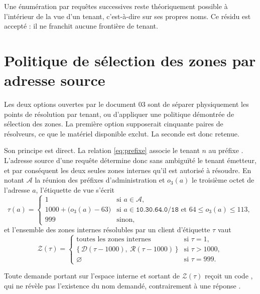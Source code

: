 Une énumération par requêtes successives reste théoriquement possible à
l'intérieur de la vue d'un tenant, c'est-à-dire sur ses propres noms. Ce résidu
est accepté : il ne franchit aucune frontière de tenant.

\section{Politique de sélection des zones par adresse source}
\label{sec:vue}

Les deux options ouvertes par le document 03 sont de séparer physiquement les
points de résolution par tenant, ou d'appliquer une politique démontrée de
sélection des zones. La première option supposerait cinquante paires de
résolveurs, ce que le matériel disponible exclut. La seconde est donc retenue.

Son principe est direct. La relation \eqref{eq:prefixe} associe le tenant $n$ au
préfixe . L'adresse source d'une requête détermine donc
sans ambiguïté le tenant émetteur, et par conséquent les deux seules zones
internes qu'il est autorisé à résoudre. En notant $\mathcal{A}$ la réunion des
préfixes d'administration et $o_3(a)$ le troisième octet de l'adresse $a$,
l'étiquette de vue s'écrit
\begin{equation}
  \tau(a) =
  \begin{cases}
    1 & \text{si } a \in \mathcal{A},\\[3pt]
    1000 + \bigl(o_3(a) - 63\bigr)
      & \text{si } a \in \texttt{10.30.64.0/18}
        \text{ et } 64 \leqslant o_3(a) \leqslant 113,\\[3pt]
    999 & \text{sinon,}
  \end{cases}
  \label{eq:tau}
\end{equation}
et l'ensemble des zones internes résolubles par un client d'étiquette
$\tau$ vaut
\begin{equation}
  \mathcal{Z}(\tau) =
  \begin{cases}
    \text{toutes les zones internes} & \text{si } \tau = 1,\\[3pt]
    \bigl\{\, \mathcal{D}(\tau-1000),\ \mathcal{R}(\tau-1000) \,\bigr\}
      & \text{si } \tau > 1000,\\[3pt]
    \varnothing & \text{si } \tau = 999 .
  \end{cases}
  \label{eq:zones}
\end{equation}

Toute demande portant sur l'espace interne et sortant de $\mathcal{Z}(\tau)$
reçoit un code , qui ne révèle pas l'existence du nom demandé,
contrairement à une réponse .

